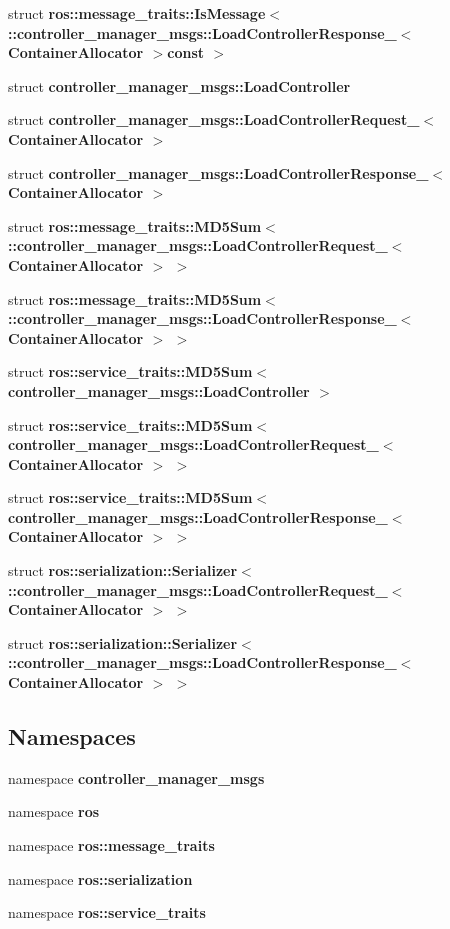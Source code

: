 \begin{DoxyCompactItemize}
struct {\bf ros\-::message\-\_\-traits\-::\-Is\-Message$<$ \-::controller\-\_\-manager\-\_\-msgs\-::\-Load\-Controller\-Response\-\_\-$<$ Container\-Allocator $>$const  $>$}
\item 
struct {\bf controller\-\_\-manager\-\_\-msgs\-::\-Load\-Controller}
\item 
struct {\bf controller\-\_\-manager\-\_\-msgs\-::\-Load\-Controller\-Request\-\_\-$<$ Container\-Allocator $>$}
\item 
struct {\bf controller\-\_\-manager\-\_\-msgs\-::\-Load\-Controller\-Response\-\_\-$<$ Container\-Allocator $>$}
\item 
struct {\bf ros\-::message\-\_\-traits\-::\-M\-D5\-Sum$<$ \-::controller\-\_\-manager\-\_\-msgs\-::\-Load\-Controller\-Request\-\_\-$<$ Container\-Allocator $>$ $>$}
\item 
struct {\bf ros\-::message\-\_\-traits\-::\-M\-D5\-Sum$<$ \-::controller\-\_\-manager\-\_\-msgs\-::\-Load\-Controller\-Response\-\_\-$<$ Container\-Allocator $>$ $>$}
\item 
struct {\bf ros\-::service\-\_\-traits\-::\-M\-D5\-Sum$<$ controller\-\_\-manager\-\_\-msgs\-::\-Load\-Controller $>$}
\item 
struct {\bf ros\-::service\-\_\-traits\-::\-M\-D5\-Sum$<$ controller\-\_\-manager\-\_\-msgs\-::\-Load\-Controller\-Request\-\_\-$<$ Container\-Allocator $>$ $>$}
\item 
struct {\bf ros\-::service\-\_\-traits\-::\-M\-D5\-Sum$<$ controller\-\_\-manager\-\_\-msgs\-::\-Load\-Controller\-Response\-\_\-$<$ Container\-Allocator $>$ $>$}
\item 
struct {\bf ros\-::serialization\-::\-Serializer$<$ \-::controller\-\_\-manager\-\_\-msgs\-::\-Load\-Controller\-Request\-\_\-$<$ Container\-Allocator $>$ $>$}
\item 
struct {\bf ros\-::serialization\-::\-Serializer$<$ \-::controller\-\_\-manager\-\_\-msgs\-::\-Load\-Controller\-Response\-\_\-$<$ Container\-Allocator $>$ $>$}
\end{DoxyCompactItemize}
\subsection*{\-Namespaces}
\begin{DoxyCompactItemize}
\item 
namespace {\bf controller\-\_\-manager\-\_\-msgs}
\item 
namespace {\bf ros}
\item 
namespace {\bf ros\-::message\-\_\-traits}
\item 
namespace {\bf ros\-::serialization}
\item 
namespace {\bf ros\-::service\-\_\-traits}
\end{DoxyCompactItemize}
